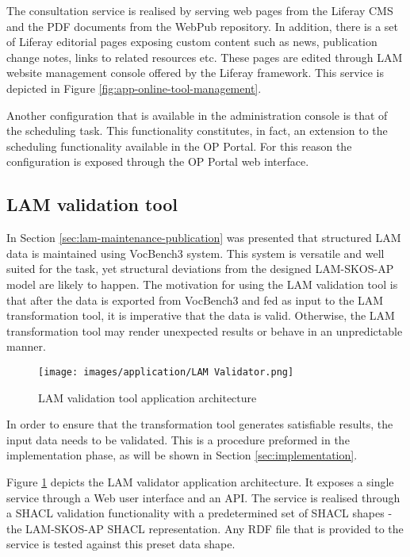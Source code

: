 	The consultation service is realised by serving web pages from the Liferay CMS and the PDF documents from the WebPub repository. In addition, there is a set of Liferay editorial pages exposing custom content such as news, publication change notes, links to related resources etc. These pages are edited through LAM website management console offered by the Liferay framework. This service is depicted in Figure \ref{fig:app-online-tool-management}. 
	
	Another configuration that is available in the administration console is that of the scheduling task. This functionality constitutes, in fact, an extension to the scheduling functionality available in the OP Portal. For this reason the configuration is exposed through the OP Portal web interface. 
	
	\subsection{LAM validation tool}
	
	In Section \ref{sec:lam-maintenance-publication} was presented that structured LAM data is maintained using VocBench3 system. This system is versatile and well suited for the task, yet structural deviations from the designed LAM-SKOS-AP model are likely to happen. 
	The motivation for using the LAM validation tool is that after the data is exported from VocBench3 and fed as input to the LAM transformation tool, it is imperative that the data is valid. Otherwise, the LAM transformation tool may render unexpected results or behave in an unpredictable manner. 
	
 	\begin{figure}[!h]
		\centering
		\texttt{[image: images/application/LAM Validator.png]}
		\caption{LAM validation tool application architecture}
		\label{fig:app-lam-validator}
	\end{figure}

	In order to ensure that the transformation tool generates satisfiable results, the input data needs to be validated. This is a procedure preformed in the implementation phase, as will be shown in Section \ref{sec:implementation}. 
	
	Figure \ref{fig:app-lam-validator} depicts the LAM validator application architecture. It exposes a single service through a Web user interface and an API. The service is realised through a SHACL \citep{shacl-spec} validation functionality with a predetermined set of SHACL shapes - the LAM-SKOS-AP\citep{lam-skos-ap-2019} SHACL representation. Any RDF file that is provided to the service is tested against this preset data shape. 

